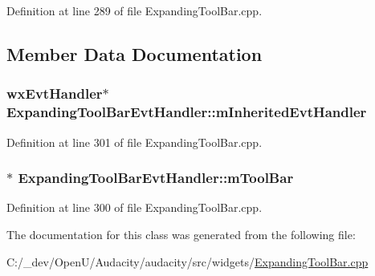 Definition at line 289 of file Expanding\+Tool\+Bar.\+cpp.



\subsection{Member Data Documentation}
\subsubsection[{\texorpdfstring{m\+Inherited\+Evt\+Handler}{mInheritedEvtHandler}}]{\setlength{\rightskip}{0pt plus 5cm}wx\+Evt\+Handler$\ast$ Expanding\+Tool\+Bar\+Evt\+Handler\+::m\+Inherited\+Evt\+Handler\hspace{0.3cm}{\ttfamily [protected]}}\hypertarget{class_expanding_tool_bar_evt_handler_a7e87778201a2ee84b2f63d1938f3c61f}{}\label{class_expanding_tool_bar_evt_handler_a7e87778201a2ee84b2f63d1938f3c61f}


Definition at line 301 of file Expanding\+Tool\+Bar.\+cpp.

\subsubsection[{\texorpdfstring{m\+Tool\+Bar}{mToolBar}}]{$\ast$ Expanding\+Tool\+Bar\+Evt\+Handler\+::m\+Tool\+Bar\hspace{0.3cm}{\ttfamily [protected]}}\hypertarget{class_expanding_tool_bar_evt_handler_a8cffb708bab0a5f3c835659cf41f7d67}{}\label{class_expanding_tool_bar_evt_handler_a8cffb708bab0a5f3c835659cf41f7d67}


Definition at line 300 of file Expanding\+Tool\+Bar.\+cpp.



The documentation for this class was generated from the following file\+:\begin{DoxyCompactItemize}
\item 
C\+:/\+\_\+dev/\+Open\+U/\+Audacity/audacity/src/widgets/\hyperlink{_expanding_tool_bar_8cpp}{Expanding\+Tool\+Bar.\+cpp}\end{DoxyCompactItemize}
